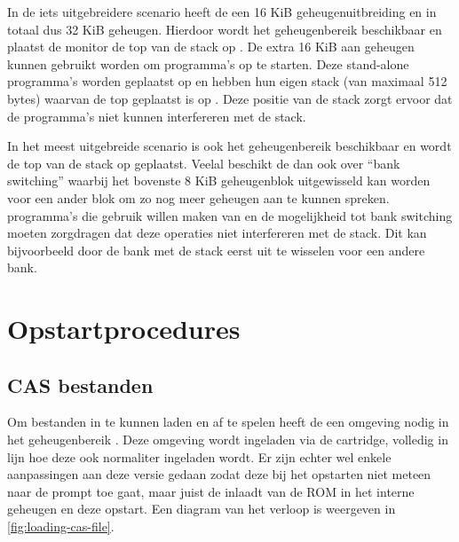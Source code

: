 In de iets uitgebreidere scenario heeft de  een 16 KiB geheugenuitbreiding en in totaal dus 32 KiB geheugen. Hierdoor wordt het geheugenbereik  beschikbaar en plaatst de monitor de top van de stack op . De extra 16 KiB aan geheugen kunnen gebruikt worden om \prg programma's op te starten. Deze stand-alone programma's worden geplaatst op  en hebben hun eigen stack (van maximaal 512 bytes) waarvan de top geplaatst is op . Deze positie van de stack zorgt ervoor dat de programma's niet kunnen interfereren met de \basic stack.

In het meest uitgebreide scenario is ook het geheugenbereik  beschikbaar en wordt de top van de \basic stack op  geplaatst. Veelal beschikt de  dan ook over ``bank switching'' waarbij het bovenste 8 KiB geheugenblok uitgewisseld kan worden voor een ander blok om zo nog meer geheugen aan te kunnen spreken. \prg programma's die gebruik willen maken van  en de mogelijkheid tot bank switching moeten zorgdragen dat deze operaties niet interfereren met de \basic stack. Dit kan bijvoorbeeld door de bank met de \basic stack eerst uit te wisselen voor een andere bank.

%
%
%
\section{Opstartprocedures}

%
%
\subsection{CAS bestanden}

Om \cas bestanden in te kunnen laden en af te spelen heeft de \product een \basic omgeving nodig in het geheugenbereik . Deze \basic omgeving wordt ingeladen via de  cartridge, volledig in lijn hoe deze ook normaliter ingeladen wordt. Er zijn echter wel enkele aanpassingen aan deze \basic versie gedaan zodat deze bij het opstarten niet meteen naar de \basic prompt toe gaat, maar juist de \launcher inlaadt van de  ROM in het interne geheugen en deze opstart. Een diagram van het verloop is weergeven in \cref{fig:loading-cas-file}.

